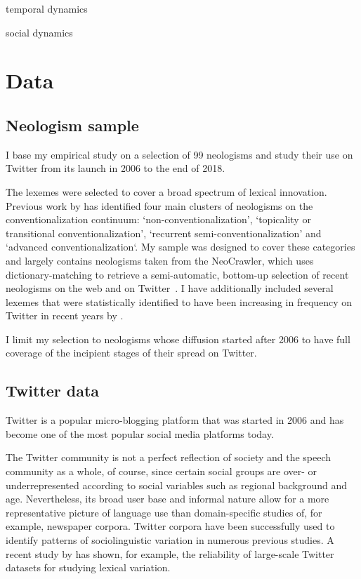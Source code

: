 \documentclass[
  a4paper,
  abstract=on,
  captions=tableabove
  ]{scrartcl}
\begin{document}
      temporal dynamics

      social dynamics
          
\section{Data}
  \label{sec:data}
  \subsection{Neologism sample}
    \label{subsec:neo-sample}

  I base my empirical study on a selection of 99 neologisms and study their use on Twitter from its launch in 2006 to the end of 2018.

  The lexemes were selected to cover a broad spectrum of lexical innovation. Previous work by \textcite[115--147]{Kerremans2015WebNew} has identified four main clusters of neologisms on the conventionalization continuum: `non-conventionalization', `topicality or transitional conventionalization', `recurrent semi-conventionalization' and `advanced conventionalization`. My sample was designed to cover these categories and largely contains neologisms taken from the NeoCrawler, which uses dictionary-matching to retrieve a semi-automatic, bottom-up selection of recent neologisms on the web and on Twitter~\parencite{Kerremans2019UsingDatamining}. I have additionally included several lexemes that were statistically identified to have been increasing in frequency on Twitter in recent years by \textcite{Grieve2016AnalyzingLexical}.

  I limit my selection to neologisms whose diffusion started after 2006 to have full coverage of the incipient stages of their spread on Twitter.

  \subsection{Twitter data}
    \label{subsec:twitter-data}

    Twitter is a popular micro-blogging platform that was started in 2006 and has become one of the most popular social media platforms today.

    The Twitter community is not a perfect reflection of society and the speech community as a whole, of course, since certain social groups are over- or underrepresented according to social variables such as regional background and age. Nevertheless, its broad user base and informal nature allow for a more representative picture of language use than domain-specific studies of, for example, newspaper corpora. Twitter corpora have been successfully used to identify patterns of sociolinguistic variation in numerous previous studies. A recent study by \textcite{Grieve2019MappingLexical} has shown, for example, the reliability of large-scale Twitter datasets for studying lexical variation.
\end{document}
